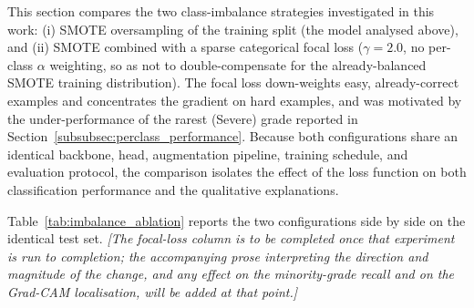 
This section compares the two class-imbalance strategies investigated in this work:
(i) SMOTE oversampling of the training split (the model analysed above), and
(ii) SMOTE combined with a sparse categorical focal loss
($\gamma = 2.0$, no per-class $\alpha$ weighting, so as not to double-compensate for
the already-balanced SMOTE training distribution). The focal loss down-weights
easy, already-correct examples and concentrates the gradient on hard examples, and
was motivated by the under-performance of the rarest (Severe) grade reported in
Section~\ref{subsubsec:perclass_performance}. Because both configurations share an
identical backbone, head, augmentation pipeline, training schedule, and evaluation
protocol, the comparison isolates the effect of the loss function on both
classification performance and the qualitative explanations.

Table~\ref{tab:imbalance_ablation} reports the two configurations side by side on
the identical test set. \emph{[The focal-loss column is to be completed once that
experiment is run to completion; the accompanying prose interpreting the direction
and magnitude of the change, and any effect on the minority-grade recall and on the
Grad-CAM localisation, will be added at that point.]}

